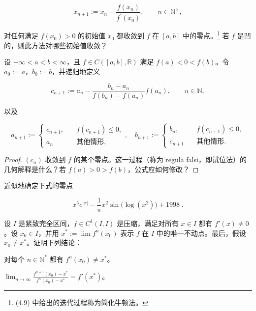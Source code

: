 \begin{exercises}
\begin{equation}
x_{n+1}:=x_{n}-\frac{f(x_{n})}{f^{\prime}(x_{0})},\qquad n\in\mathbb{N}^{\times},
\end{equation}

对任何满足 $f(x_0) > 0$ 的初始值 $x_0$ 都收敛到 $f$ 在 $[a, b]$ 中的零点。\footnote{(4.9) 中给出的迭代过程称为简化牛顿法。} 若 $f$ 是凹的，则此方法对哪些初始值收敛？

\item

设 $ -\infty < a < b < \infty $，且 $ f \in C([a, b], \mathbb{R}) $ 满足 $ f(a) < 0 < f(b) $。令 $ a_0 := a $，$ b_0 := b $，并递归地定义

\begin{equation}
c_{n+1}:=a_{n}-\frac{b_{n}-a_{n}}{f(b_{n})-f(a_{n})}f(a_{n}),\qquad n\in\mathbb{N},
\end{equation}

以及

\begin{equation}
a_{n+1}:=\left\{\begin{array}{ll}c_{n+1},&\quad f(c_{n+1})\leq0,\\a_{n}&\quad\text{其他情形},\end{array}\right.,\quad b_{n+1}:=\left\{\begin{array}{ll}b_{n},&\quad f(c_{n+1})\leq0,\\c_{n+1}&\quad\text{其他情形}.\end{array}\right.
\end{equation}
\end{exercises}

\begin{proof}

$(c_n)$ 收敛到 $f$ 的某个零点。这一过程（称为 regula falsi，即试位法）的几何解释是什么？若 $f(a) > 0 > f(b)$，公式应如何修改？

\end{proof}

\begin{exercises}
\item[9.]

近似地确定下式的零点

\[
x^{5}e^{|x|}-\frac{1}{\pi}x^{2}\sin\bigl(\log(x^{2})\bigr)+1998\;.
\]
\item[10.]

设 $ I $ 是紧致完全区间，$ f \in C^1(I, I) $ 是压缩，满足对所有 $ x \in I $ 都有 $ f'(x) \neq 0 $。设 $ x_0 \in I $，并用 $ x^* := \lim f^n(x_0) $ 表示 $ f $ 在 $ I $ 中的唯一不动点。最后，假设 $ x_0 \neq x^* $。证明下列结论：

\begin{items}
\item

对每个 $ n \in \mathbb{N}^* $ 都有 $ f^n(x_0) \neq x^* $。

\item

$ \lim_{n \to \infty} \frac{f^{n+1}(x_0) - x^*}{f^n(x_0) - x^*} = f'(x^*) $。

\end{items}

\end{exercises}
